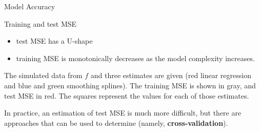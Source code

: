 \documentclass[
  ignorenonframetext,
]{beamer}
\providecommand{\tightlist}{%
  \setlength{\itemsep}{0pt}\setlength{\parskip}{0pt}}\usepackage{longtable,booktabs,array}
\begin{document}
\begin{frame}{Model Accuracy}
\begin{block}{Training and test MSE}
\begin{itemize}
\tightlist
\item
  test MSE has a U-shape
\item
  training MSE is monotonically decreases as the model complexity
  increases.
\end{itemize}

The simulated data from \(f\) and three estimates are given (red linear
regression and blue and green smoothing splines). The training MSE is
shown in gray, and test MSE in red. The squares represent the values for
each of those estimates.

In practice, an estimation of test MSE is much more difficult, but there
are approaches that can be used to determine (namely,
\textbf{cross-validation}).
\end{block}
\end{frame}
\end{document}

